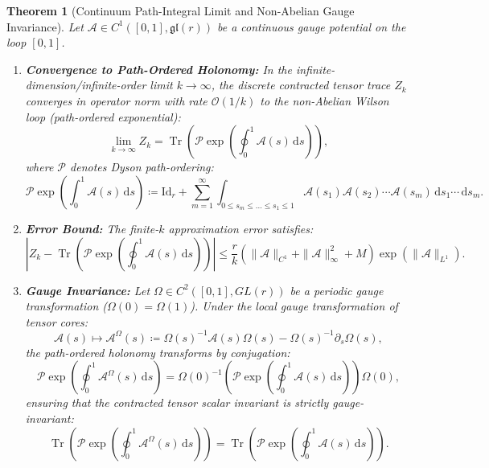 \documentclass[11pt,a4paper,reqno]{amsart}
\newtheorem{theorem}{Theorem}[section]
\theoremstyle{definition}
\numberwithin{equation}{section}
\newcommand{\Id}{\mathrm{Id}}
\newcommand{\Tr}{\operatorname{Tr}}
\newcommand{\dif}{\,\mathrm{d}}
\begin{document}
\begin{theorem}[Continuum Path-Integral Limit and Non-Abelian Gauge Invariance]
\label{thm:continuous_path_integral}
Let $\mathcal{A} \in C^1([0, 1], \mathfrak{gl}(r))$ be a continuous gauge potential on the loop $[0, 1]$.
\begin{enumerate}[label=(\roman*)]
    \item \textbf{Convergence to Path-Ordered Holonomy:} In the infinite-dimension/infinite-order limit $k \to \infty$, the discrete contracted tensor trace $Z_k$ converges in operator norm with rate $\mathcal{O}(1/k)$ to the non-Abelian Wilson loop (path-ordered exponential):
    \begin{equation}
        \label{eq:path_ordered_limit}
        \lim_{k \to \infty} Z_k = \Tr\left( \mathcal{P} \exp\left( \oint_0^1 \mathcal{A}(s) \dif s \right) \right),
    \end{equation}
    where $\mathcal{P}$ denotes Dyson path-ordering:
    \begin{equation}
        \mathcal{P} \exp\left( \int_0^1 \mathcal{A}(s) \dif s \right) \coloneqq \Id_r + \sum_{m=1}^\infty \int_{0 \le s_m \le \dots \le s_1 \le 1} \mathcal{A}(s_1) \mathcal{A}(s_2) \cdots \mathcal{A}(s_m) \dif s_1 \cdots \dif s_m.
    \end{equation}
    \item \textbf{Error Bound:} The finite-$k$ approximation error satisfies:
    \begin{equation}
        \label{eq:dyson_error_bound}
        \left| Z_k - \Tr\left( \mathcal{P} \exp\left( \oint_0^1 \mathcal{A}(s) \dif s \right) \right) \right| \le \frac{r}{k} \left( \|\mathcal{A}\|_{C^1} + \|\mathcal{A}\|_\infty^2 + M \right) \exp\left( \|\mathcal{A}\|_{L^1} \right).
    \end{equation}
    \item \textbf{Gauge Invariance:} Let $\Omega \in C^2([0, 1], GL(r))$ be a periodic gauge transformation ($\Omega(0) = \Omega(1)$). Under the local gauge transformation of tensor cores:
    \begin{equation}
        \label{eq:continuous_gauge_field}
        \mathcal{A}(s) \mapsto \mathcal{A}^\Omega(s) \coloneqq \Omega(s)^{-1} \mathcal{A}(s) \Omega(s) - \Omega(s)^{-1} \partial_s \Omega(s),
    \end{equation}
    the path-ordered holonomy transforms by conjugation:
    \begin{equation}
        \mathcal{P} \exp\left( \oint_0^1 \mathcal{A}^\Omega(s) \dif s \right) = \Omega(0)^{-1} \left( \mathcal{P} \exp\left( \oint_0^1 \mathcal{A}(s) \dif s \right) \right) \Omega(0),
    \end{equation}
    ensuring that the contracted tensor scalar invariant is strictly gauge-invariant:
    \begin{equation}
        \Tr\left( \mathcal{P} \exp\left( \oint_0^1 \mathcal{A}^\Omega(s) \dif s \right) \right) = \Tr\left( \mathcal{P} \exp\left( \oint_0^1 \mathcal{A}(s) \dif s \right) \right).
    \end{equation}
\end{enumerate}
\end{theorem}
\end{document}
